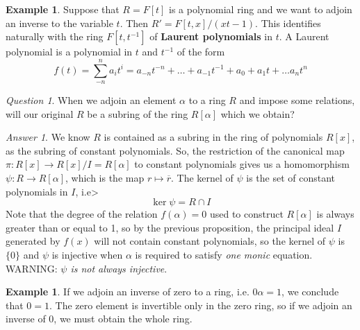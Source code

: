 \documentclass[12pt]{article}
\theoremstyle{definition}
\newtheorem{eg}[thm]{Example}
\theoremstyle{remark}
\newtheorem*{qst}{Question}
\newtheorem*{ans}{Answer}
\numberwithin{equation}{section}
\newcommand\B[1]{\textbf{ #1}}
\begin{document}
\vspace{15pt}


\begin{eg}
        Suppose that $R = F[t]$ is a polynomial ring and we want to adjoin an inverse to the variable $t$. Then $R' = F[t,x]/(xt-1)$. This identifies naturally with the ring $F[t,t^{-1}]$ of \B{Laurent polynomials} in $t$. A Laurent polynomial is a polynomial in $t$ and $t^{-1}$ of the form \begin{equation}
                f(t) = \sum\limits_{-n}^na_it^i = a_{-n}t^{-n} + \hdots + a_{-1}t^{-1} + a_0 + a_1t + \hdots a_nt^n
        \end{equation}
\end{eg}

\vspace{15pt}


\begin{qst}
        When we adjoin an element $\alpha$ to a ring $R$ and impose some relations, will our original $R$ be a subring of the ring $R[\alpha]$ which we obtain?
\end{qst}
\begin{ans}
        We know $R$ is contained as a subring in the ring of polynomials $R[x]$, as the subring of constant polynomials. So, the restriction of the canonical map $\pi:R[x] \rightarrow R[x]/I = R[\alpha]$ to constant polynomials gives us a homomorphism $\psi:R\rightarrow R[\alpha]$, which is the map $r\mapsto \overline{r}$. The kernel of $\psi$ is the set of constant polynomials in $I$, i.e> \begin{equation}
                \ker \psi = R\cap I
        \end{equation}
        Note that the degree of the relation $f(\alpha) = 0$ used to construct $R[\alpha]$ is always greater than or equal to 1, so by the previous proposition, the principal ideal $I$ generated by $f(x)$ will not contain constant polynomials, so the kernel of $\psi$ is $\{0\}$ and $\psi$ is injective when $\alpha$ is required to satisfy \emph{one monic} equation. WARNING: \emph{$\psi$ is not always injective}.
\end{ans}

\vspace{15pt}

\begin{eg}
        If we adjoin an inverse of zero to a ring, i.e. $0\alpha = 1$, we conclude that $0=1$. The zero element is invertible only in the zero ring, so if we adjoin an inverse of $0$, we must obtain the whole ring.
\end{eg}
\end{document}
